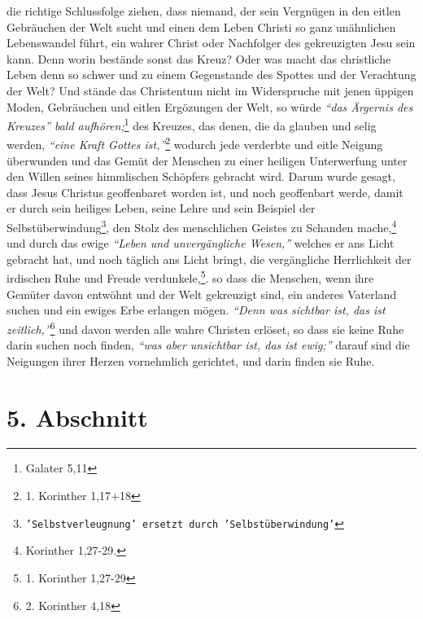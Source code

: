 die richtige Schlussfolge ziehen, dass niemand, der sein Vergnügen in den eitlen
Gebräuchen der Welt sucht und einen dem Leben Christi so ganz unähnlichen
Lebenswandel führt, ein wahrer Christ oder Nachfolger des gekreuzigten Jesu sein
kann. Denn worin bestände sonst das Kreuz? Oder was macht das christliche
Leben denn so schwer und zu einem Gegenstande des Spottes und der Verachtung der
Welt? Und stände das Christentum nicht im Widerspruche mit jenen üppigen Moden,
Gebräuchen und eitlen Ergözungen der Welt, so würde
\textit{"`das Ärgernis des Kreuzes"' bald aufhören;}\footnote{Galater 5,11}
des Kreuzes, das denen, die da glauben und
selig werden,
\textit{"`eine Kraft Gottes ist,"'}\footnote{1. Korinther 1,17+18}
wodurch jede
verderbte und eitle Neigung überwunden und das Gemüt der Menschen zu einer
heiligen Unterwerfung unter den Willen seines himmlischen Schöpfers gebracht
wird. Darum wurde gesagt, dass Jesus Christus geoffenbaret worden ist, und noch
geoffenbart werde, damit er durch sein heiliges Leben, seine Lehre und sein
Beispiel der Selbstüberwindung\footnote{\texttt{'Selbstverleugnung' ersetzt
durch 'Selbstüberwindung'}}, den Stolz des menschlichen Geistes zu Schanden
mache,\footnote{Korinther 1,27-29.}
und durch das ewige \textit{"`Leben und unvergängliche
Wesen,"'} welches er ans Licht gebracht hat, und noch täglich ans
Licht bringt,
die vergängliche Herrlichkeit der irdischen Ruhe und Freude
verdunkele,\footnote{1. Korinther 1,27-29}.
so dass die Menschen, wenn ihre
Gemüter davon entwöhnt und der Welt gekreuzigt sind, ein anderes Vaterland
suchen und ein ewiges Erbe erlangen mögen.
\textit{"`Denn was sichtbar ist, das ist zeitlich,"'}\footnote{2. Korinther
4,18}
und davon werden alle wahre Christen erlöset,
so dass sie keine Ruhe darin suchen noch finden,
\textit{"`was aber unsichtbar ist, das
ist ewig;"'} darauf sind die Neigungen ihrer Herzen vornehmlich gerichtet, und
darin finden sie Ruhe.

\section{5. Abschnitt} \label{kap16_ab5}

